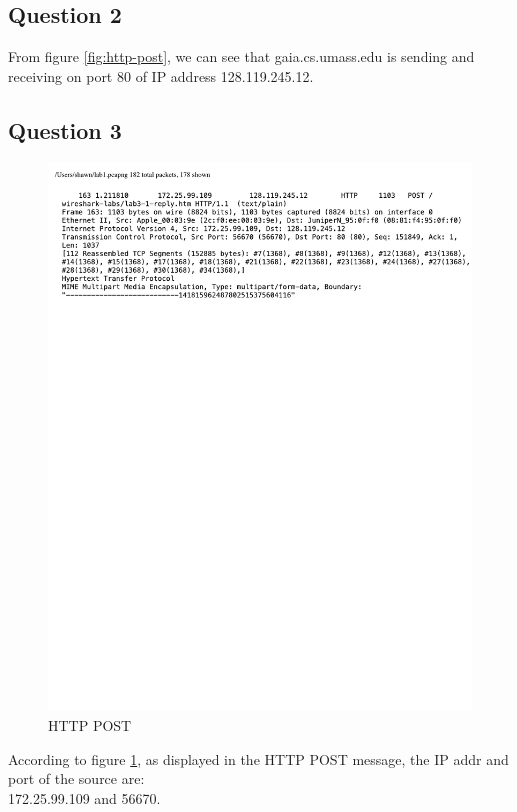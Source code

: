 \documentclass[titlepage, paper=a4, fontsize=11pt]{scrartcl} %
\numberwithin{equation}{section} %
\numberwithin{figure}{section} %
\numberwithin{table}{section} %
\begin{document}
\subsection*{Question 2}
From figure \ref{fig:http-post}, we can see that gaia.cs.umass.edu is sending and receiving on port 80 of IP address 128.119.245.12. \\

\subsection*{Question 3}
\begin{figure}[!ht]
    \centering
    \includegraphics[width=\textwidth]{images/lab1-q3.pdf}
    \caption{HTTP POST}
    \label{fig:http-post2}
\end{figure}
According to figure \ref{fig:http-post2}, as displayed in the HTTP POST message, the IP addr and port of the source are: \\
172.25.99.109 and 56670. \\
\end{document}
